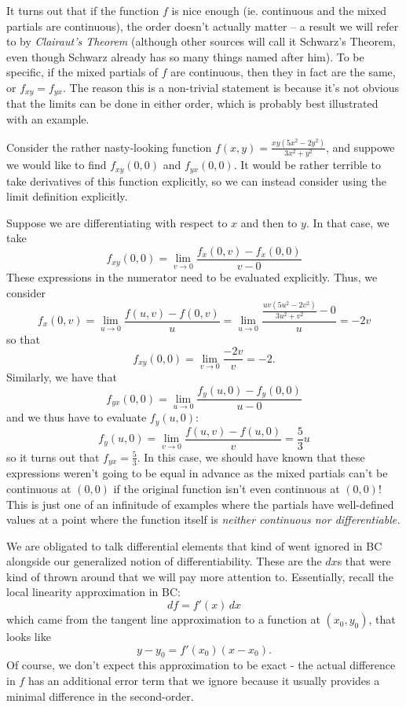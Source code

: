 It turns out that if the function $f$ is nice enough (ie. continuous and the mixed partials are continuous), the order doesn't actually matter -- a result we will refer to by \textit{Clairaut's Theorem} (although other sources will call it Schwarz's Theorem, even though Schwarz already has so many things named after him). To be specific, if the mixed partials of $f$ are continuous, then they in fact are the same, or $f_{xy} = f_{yx}$. The reason this is a non-trivial statement is because it's not obvious that the limits can be done in either order, which is probably best illustrated with an example. 

Consider the rather nasty-looking function $f(x, y) = \frac{xy(5x^2 - 2y^2)}{3x^2 + y^2}$, and suppowe we would like to find $f_{xy}(0,0)$ and $f_{yx}(0,0)$. It would be rather terrible to take derivatives of this function explicitly, so we can instead consider using the limit definition explicitly. 

Suppose we are differentiating with respect to $x$ and then to $y$. In that case, we take 
\[
	f_{xy}(0,0) = \lim_{v \to 0} \frac{f_x(0,v) - f_x(0, 0)}{v-0}
\]
These expressions in the numerator need to be evaluated explicitly. Thus, we consider 
\[
	f_x(0, v) = \lim_{u \to 0} \frac{f(u, v) - f(0, v)}{u} = \lim_{u \to 0} \frac{\frac{uv(5u^2 - 2v^2)}{3u^2 + v^2} - 0}{u} = -2v
\]
so that 
\[
	f_{xy}(0,0) = \lim_{v\to 0} \frac{-2v}{v} = -2.
\]
Similarly, we have that
\[
	f_{yx}(0,0) = \lim_{u \to 0} \frac{f_y(u, 0) - f_y(0, 0)}{u - 0}
\] 
and we thus have to evaluate $f_y(u, 0)$: 
\[
	f_y(u, 0) = \lim_{v \to 0} \frac{f(u, v) - f(u, 0)}{v} = \frac{5}{3}u
\]
so it turns out that $f_{yx} = \frac{5}{3}$. In this case, we should have known that these expressions weren't going to be equal in advance as the mixed partials can't be continuous at $(0, 0)$ if the original function isn't even continuous at $(0, 0)$! This is just one of an infinitude of examples where the partials have well-defined values at a point where the function itself is \textit{neither continuous nor differentiable.}

We are obligated to talk differential elements that kind of went ignored in BC alongside our generalized notion of differentiability. These are the $dx$s that were kind of thrown around that we will pay more attention to. Essentially, recall the local linearity approximation in BC: 
\[
	df = f'(x) \, dx 
\]
which came from the tangent line approximation to a function at $(x_0, y_0)$, that looks like
\[
	y-y_0 = f'(x_0)(x-x_0).
\]
Of course, we don't expect this approximation to be exact - the actual difference in $f$ has an additional error term that we ignore because it usually provides a minimal difference in the second-order. 

